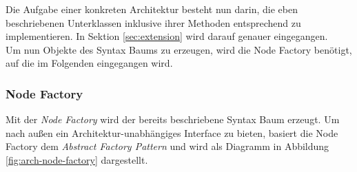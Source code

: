 Die Aufgabe einer konkreten Architektur besteht nun darin, die eben beschriebenen
Unterklassen inklusive ihrer Methoden entsprechend zu implementieren. In Sektion
\ref{sec:extension} wird darauf genauer eingegangen. \\
Um nun Objekte des Syntax Baums zu erzeugen, wird die Node Factory benötigt, auf
die im Folgenden eingegangen wird.

\subsubsection{Node Factory}
\label{module-arch-node-factory}

Mit der \textit{Node Factory} wird der bereits beschriebene Syntax Baum erzeugt.
Um nach außen ein Architektur-unabhängiges Interface zu bieten, basiert die
Node Factory dem \textit{Abstract Factory Pattern} und wird als Diagramm in
Abbildung \ref{fig:arch-node-factory} dargestellt.

